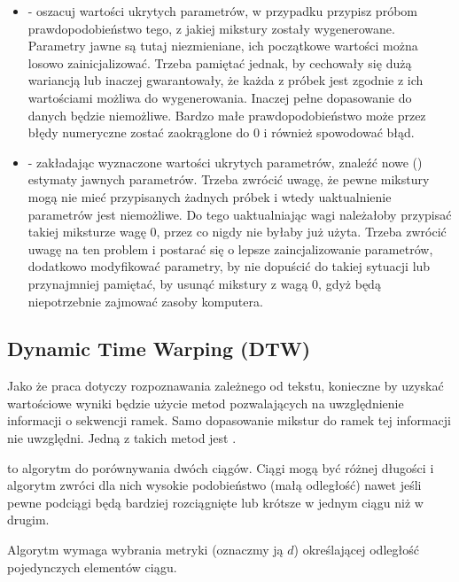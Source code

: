 \begin{itemize}
    \item {} - oszacuj wartości ukrytych parametrów, w przypadku  przypisz próbom
        prawdopodobieństwo tego, z jakiej mikstury zostały wygenerowane. Parametry jawne są tutaj niezmieniane,
        ich początkowe wartości można losowo zainicjalizować. Trzeba pamiętać jednak, by cechowały się dużą wariancją
        lub inaczej gwarantowały, że każda z próbek jest zgodnie z ich wartościami możliwa do wygenerowania. Inaczej
        pełne dopasowanie do danych będzie niemożliwe. Bardzo małe prawdopodobieństwo może przez błędy numeryczne
        zostać zaokrąglone do $0$ i również spowodować błąd.
    \item {} - zakładając wyznaczone wartości ukrytych parametrów, znaleźć nowe 
        () estymaty
        jawnych parametrów. Trzeba zwrócić uwagę, że pewne mikstury mogą nie mieć przypisanych żadnych próbek
        i wtedy uaktualnienie parametrów jest niemożliwe. Do tego uaktualniając wagi  należałoby
        przypisać takiej miksturze wagę $0$, przez co nigdy nie byłaby już użyta. Trzeba zwrócić uwagę na ten problem
        i postarać się o lepsze zaincjalizowanie parametrów, dodatkowo modyfikować parametry, by nie dopuścić
        do takiej sytuacji lub przynajmniej pamiętać, by usunąć mikstury z wagą $0$, gdyż będą niepotrzebnie zajmować
        zasoby komputera.
\end{itemize}

\subsection{Dynamic Time Warping (DTW)}\label{sec:dtw}

Jako że praca dotyczy rozpoznawania zależnego od tekstu, konieczne by uzyskać wartościowe wyniki będzie
użycie metod pozwalających na uwzględnienie informacji o sekwencji ramek. Samo dopasowanie mikstur do ramek
tej informacji nie uwzględni. Jedną z takich metod jest .

 to algorytm do porównywania dwóch ciągów. Ciągi mogą być różnej długości i algorytm zwróci
dla nich wysokie podobieństwo (małą odległość) nawet jeśli pewne podciągi będą bardziej rozciągnięte lub krótsze
w jednym ciągu niż w drugim.

Algorytm wymaga wybrania metryki (oznaczmy ją $d$) określającej odległość pojedynczych elementów ciągu.

